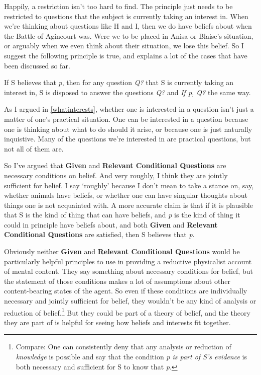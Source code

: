 \documentclass[
  11pt,
]{book}
\providecommand{\tightlist}{%
  \setlength{\itemsep}{0pt}\setlength{\parskip}{0pt}}
\begin{document}
Happily, a restriction isn't too hard to find. The principle just needs to be restricted to questions that the subject is currently taking an interest in. When we're thinking about questions like H and I, then we do have beliefs about when the Battle of Agincourt was. Were we to be placed in Anisa or Blaise's situation, or arguably when we even think about their situation, we lose this belief. So I suggest the following principle is true, and explains a lot of the cases that have been discussed so far.

\begin{description}
\tightlist
\item[Relevant Conditional Questions]
If S believes that \emph{p}, then for any question \emph{Q?} that S is currently taking an interest in, S is disposed to answer the questions \emph{Q?} and \emph{If p, Q?} the same way.
\end{description}

As I argued in \ref{whatinterests}, whether one is interested in a question isn't just a matter of one's practical situation. One can be interested in a question because one is thinking about what to do should it arise, or because one is just naturally inquistive. Many of the questions we're interested in are practical questions, but not all of them are.

So I've argued that \textbf{Given} and \textbf{Relevant Conditional Questions} are necessary conditions on belief. And very roughly, I think they are jointly sufficient for belief. I say `roughly' because I don't mean to take a stance on, say, whether animals have beliefs, or whether one can have singular thoughts about things one is not acquainted with. A more accurate claim is that if it is plausible that S is the kind of thing that can have beliefs, and \emph{p} is the kind of thing it could in principle have beliefs about, and both \textbf{Given} and \textbf{Relevant Conditional Questions} are satisfied, then S believes that \emph{p}.

Obviously neither \textbf{Given} and \textbf{Relevant Conditional Questions} would be particularly helpful principles to use in providing a reductive physicalist account of mental content. They say something about necessary conditions for belief, but the statement of those conditions makes a lot of assumptions about other content-bearing states of the agent. So even if these conditions are individually necessary and jointly sufficient for belief, they wouldn't be any kind of analysis or reduction of belief.\footnote{Compare: One can consistently deny that any analysis or reduction of \emph{knowledge} is possible and say that the condition \emph{p is part of S's evidence} is both necessary and sufficient for S to know that \emph{p}.} But they could be part of a theory of belief, and the theory they are part of is helpful for seeing how beliefs and interests fit together.
\end{document}
